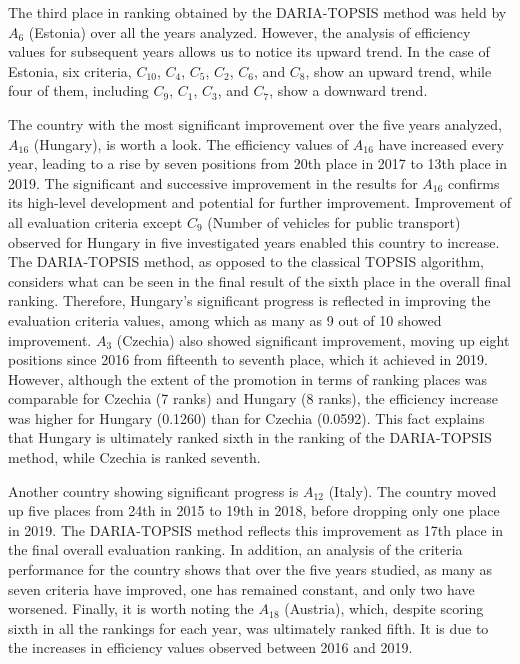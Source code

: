 \documentclass[5p,times]{elsarticle}
\begin{document}
The third place in ranking obtained by the DARIA-TOPSIS method was held by $A_{6}$ (Estonia) over all the years analyzed. However, the analysis of efficiency values for subsequent years allows us to notice its upward trend. In the case of Estonia, six criteria, $C_{10}$, $C_{4}$, $C_{5}$, $C_{2}$, $C_{6}$, and $C_{8}$, show an upward trend, while four of them, including $C_{9}$, $C_{1}$, $C_{3}$, and $C_{7}$, show a downward trend.

The country with the most significant improvement over the five years analyzed, $A_{16}$ (Hungary), is worth a look. The efficiency values of $A_{16}$ have increased every year, leading to a rise by seven positions from 20th place in 2017 to 13th place in 2019. The significant and successive improvement in the results for $A_{16}$ confirms its high-level development and potential for further improvement. Improvement of all evaluation criteria except $C_{9}$ (Number of vehicles for public transport) observed for Hungary in five investigated years enabled this country to increase. The DARIA-TOPSIS method, as opposed to the classical TOPSIS algorithm, considers what can be seen in the final result of the sixth place in the overall final ranking. Therefore, Hungary's significant progress is reflected in improving the evaluation criteria values, among which as many as 9 out of 10 showed improvement. $A_{3}$ (Czechia) also showed significant improvement, moving up eight positions since 2016 from fifteenth to seventh place, which it achieved in 2019. However, although the extent of the promotion in terms of ranking places was comparable for Czechia (7 ranks) and Hungary (8 ranks), the efficiency increase was higher for Hungary (0.1260) than for Czechia (0.0592). This fact explains that Hungary is ultimately ranked sixth in the ranking of the DARIA-TOPSIS method, while Czechia is ranked seventh.

Another country showing significant progress is $A_{12}$ (Italy). The country moved up five places from 24th in 2015 to 19th in 2018, before dropping only one place in 2019. The DARIA-TOPSIS method reflects this improvement as 17th place in the final overall evaluation ranking. In addition, an analysis of the criteria performance for the country shows that over the five years studied, as many as seven criteria have improved, one has remained constant, and only two have worsened. Finally, it is worth noting the $A_{18}$ (Austria), which, despite scoring sixth in all the rankings for each year, was ultimately ranked fifth. It is due to the increases in efficiency values observed between 2016 and 2019.
\end{document}
